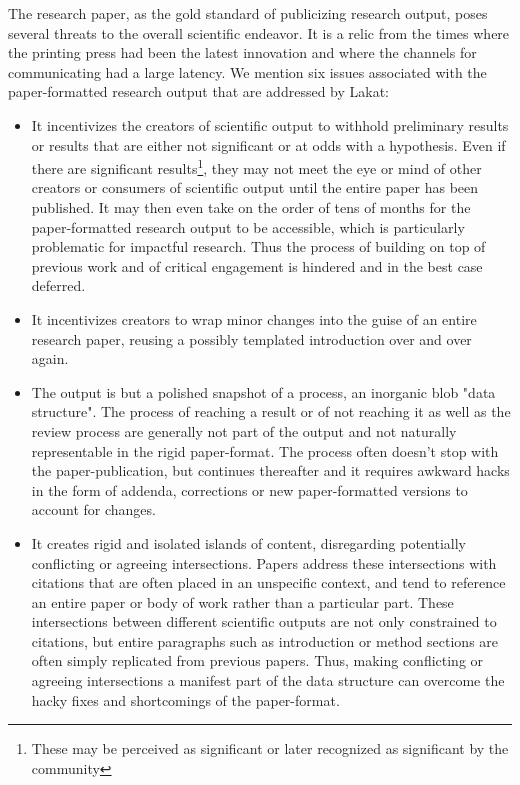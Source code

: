 The research paper, as the gold standard of publicizing research output, poses several threats to the overall scientific endeavor. It is a relic from the times where the printing press had been the latest innovation and where the channels for communicating had a large latency.  We mention six issues associated with the paper-formatted research output that are addressed by Lakat:
\begin{itemize}

 \item It incentivizes the creators of scientific output to withhold preliminary results or results that are either not significant or at odds with a hypothesis. Even if there are significant results\footnote{These may be perceived as significant or later recognized as significant by the community}, they may not meet the eye or mind of other creators or consumers of scientific output until the entire paper has been published. It may then even take on the order of tens of months for the paper-formatted research output to be accessible, which is particularly problematic for impactful research. Thus the process of building on top of previous work and of critical engagement is hindered and in the best case deferred.
 
\item It incentivizes creators to wrap minor changes into the guise of an entire research paper, reusing a possibly templated introduction over and over again. 

\item The output is but a polished snapshot of a process, an inorganic blob "data structure". The process of reaching a result or of not reaching it as well as the review process are generally not part of the output and not naturally representable in the rigid paper-format. The process often doesn't stop with the paper-publication, but continues thereafter and it requires awkward hacks in the form of addenda, corrections or new paper-formatted versions to account for changes.

\item It creates rigid and isolated islands of content, disregarding potentially conflicting or agreeing intersections. Papers address these intersections with citations that are often placed in an unspecific context, and tend to reference an entire paper or body of work rather than a particular part. These intersections between different scientific outputs are not only constrained to citations, but entire paragraphs such as introduction or method sections are often simply replicated from previous papers. Thus, making conflicting or agreeing intersections a manifest part of the data structure can overcome the hacky fixes and shortcomings of the paper-format.


\end{itemize}
